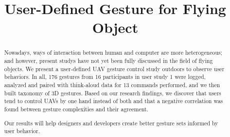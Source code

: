 \documentclass{sigchi}
\begin{document}
\title{User-Defined Gesture for Flying Object}

\maketitle

\begin{abstract}
Nowadays, ways of interaction between human and computer are more heterogeneous; and however, present studys have not yet been fully discussed in the field of flying objects. We present a user-defined UAV gesture control study outdoors to observe user behaviors. In all, 176 gestures from 16 participants in user study 1 were logged, analyzed and paired with think-aloud data for 13 commands performed, and we then built taxonomy of 3D gestures. Based on our research findings, we discover that users tend to control UAVs by one hand instead of both and that a negative correlation was found between gesture complexities and their agreement.

Our results will help designers and developers create better gesture sets informed by user behavior.
\end{abstract}
\end{document}
